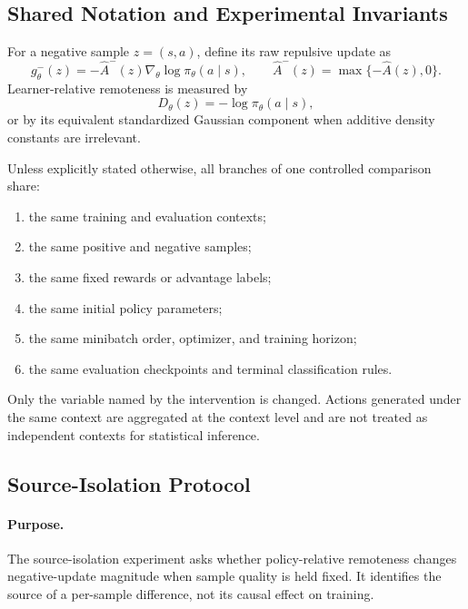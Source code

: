\documentclass{article}
\theoremstyle{plain}
\theoremstyle{definition}
\theoremstyle{remark}
\begin{document}
\subsection{Shared Notation and Experimental Invariants}
\label{app:controlled_shared}

For a negative sample
$z=(s,a)$, define its raw repulsive update as
\begin{equation}
    g_\theta^-(z)
    =
    -\widehat A^-(z)
    \nabla_\theta
    \log\pi_\theta(a\mid s),
    \qquad
    \widehat A^-(z)
    =
    \max\{-\widehat A(z),0\}.
    \label{eq:controlled_negative_update}
\end{equation}
Learner-relative remoteness is measured by
\begin{equation}
    D_\theta(z)
    =
    -\log\pi_\theta(a\mid s),
    \label{eq:controlled_remoteness}
\end{equation}
or by its equivalent standardized Gaussian component when additive
density constants are irrelevant.

Unless explicitly stated otherwise, all branches of one controlled
comparison share:

\begin{enumerate}
    \item the same training and evaluation contexts;
    \item the same positive and negative samples;
    \item the same fixed rewards or advantage labels;
    \item the same initial policy parameters;
    \item the same minibatch order, optimizer, and training horizon;
    \item the same evaluation checkpoints and terminal classification
    rules.
\end{enumerate}

Only the variable named by the intervention is changed. Actions generated
under the same context are aggregated at the context level and are not
treated as independent contexts for statistical inference.


\subsection{Source-Isolation Protocol}
\label{app:source_isolation_protocol}

\paragraph{Purpose.}
The source-isolation experiment asks whether policy-relative remoteness
changes negative-update magnitude when sample quality is held fixed. It
identifies the source of a per-sample difference, not its causal effect on
training.
\end{document}
